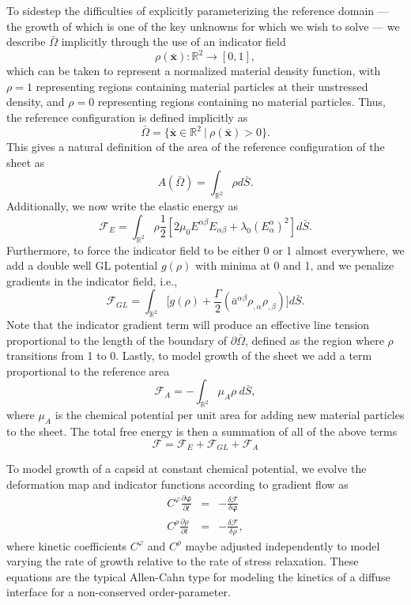 \documentclass[
pre,
 twocolumn,
amsmath,
amssymb
]{revtex4}
\begin{document}
To sidestep the difficulties of explicitly parameterizing the reference domain  --- the growth of which is one of the key unknowns for which we wish to solve --- we describe $\bar{\Omega}$ implicitly through the use of an indicator field 
\[
\rho(\bar{\bm{x}}):\mathbb{R}^2\to[0,1] ,
\]
which can be taken to represent a normalized material density function, with $\rho=1$ representing regions containing material particles at their unstressed density, and $\rho=0$ representing regions containing no material particles.  Thus, the reference configuration is defined implicitly as
\[
\bar{\Omega} = \{\bar{\bm{x}}\in\mathbb{R}^2 \ | \ \rho(\bar{\bm{x}}) > 0 \} .
\]
This gives a natural definition of the area of the reference configuration of the sheet as
\[
A(\bar{\Omega}) = \int_{\mathbb{R}^2} \rho d\bar{S} .
\]
Additionally, we now write the elastic energy as
\begin{equation}\label{eq:strainEnergyGL}
\mathcal{F}_E = \int_{\mathbb{R}^2} \rho \frac{1}{2}%
 \left[
    2\mu_0 E^{\alpha\beta}E_{\alpha\beta} + \lambda_0 (E^\alpha_\alpha)^2
  \right]
  d\bar{S} .
\end{equation}
%
Furthermore, to force the indicator field to be either 0 or 1 almost everywhere, we add a double well GL potential $g(\rho)$ with minima at 0 and 1, and we penalize gradients in the indicator field, i.e., 
\begin{equation}\label{eq:GLEnergy}
\mathcal{F}_{GL} = \int_{\mathbb{R}^2} \Big[ g(\rho) + \frac{\Gamma}{2} (\bar{a}^{\alpha\beta}\rho_{,\alpha}\rho_{,\beta}) \Big]
  d\bar{S} .
\end{equation}
Note that the indicator gradient term will produce an effective line tension proportional to the length of the boundary of $\partial\bar{\Omega}$, defined as the region where $\rho$ transitions from 1 to 0.
%
Lastly, to model growth of the sheet we add a term proportional to the reference area
\begin{equation}\label{eq:chemicalPotential}
\mathcal{F}_{A} = -\int_{\mathbb{R}^2} \mu_A \rho \ d\bar{S} ,
\end{equation}
where $\mu_A$ is the chemical potential per unit area for adding new material particles to the sheet.  The total free energy is then a summation of all of the above terms
\[
\mathcal{F} = \mathcal{F}_E + \mathcal{F}_{GL} + \mathcal{F}_A
\]

To model growth of a capsid at constant chemical potential, we evolve the deformation map and indicator functions according to gradient flow as
\begin{subequations}\label{eq:flow}
\begin{eqnarray}
 C^\varphi \frac{\partial \bm{\varphi}}{\partial t} &=& - \frac{\delta \mathcal{F}}{\delta \bm{\varphi}} \\
C^\rho \frac{\partial \rho}{\partial t} &=& -  \frac{\delta \mathcal{F}}{\delta \rho} ,
\end{eqnarray}
\end{subequations}
where kinetic coefficients $C^\varphi$ and $C^\rho$ maybe adjusted independently to model varying the rate of growth relative to the rate of stress relaxation.  These equations are the typical Allen-Cahn type for modeling the kinetics of a diffuse interface for a non-conserved order-parameter.
\end{document}
